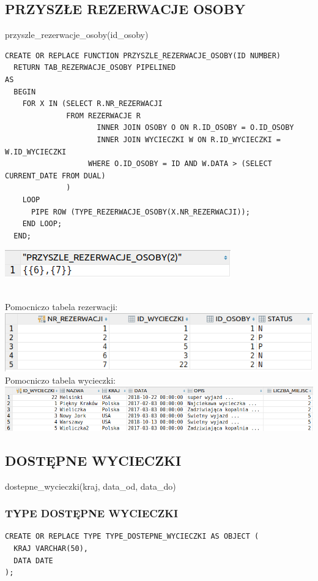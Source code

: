 \subsection{PRZYSZŁE REZERWACJE OSOBY}
przyszle\_rezerwacje\_osoby(id\_osoby)

\begin{verbatim}
CREATE OR REPLACE FUNCTION PRZYSZLE_REZERWACJE_OSOBY(ID NUMBER)
  RETURN TAB_REZERWACJE_OSOBY PIPELINED
AS
  BEGIN
    FOR X IN (SELECT R.NR_REZERWACJI
              FROM REZERWACJE R
                     INNER JOIN OSOBY O ON R.ID_OSOBY = O.ID_OSOBY
                     INNER JOIN WYCIECZKI W ON R.ID_WYCIECZKI = W.ID_WYCIECZKI
                   WHERE O.ID_OSOBY = ID AND W.DATA > (SELECT CURRENT_DATE FROM DUAL)
              )
    LOOP
      PIPE ROW (TYPE_REZERWACJE_OSOBY(X.NR_REZERWACJI));
    END LOOP;
  END;
\end{verbatim}
\begin{minipage}{0.40\textwidth}
\includegraphics[width=\linewidth]{./images/przyszle_rezerwacje_osoby.png}
\end{minipage}\\
Pomocniczo tabela rezerwacji:\\
\includegraphics[width=\linewidth]{./images/przyszle_rezerwacje_osoby_rezerwacje.png}
Pomocniczo tabela wycieczki:\\
\includegraphics[width=\linewidth]{./images/przyszle_rezerwacje_osoby_wycieczki.png}
\subsection{DOSTĘPNE WYCIECZKI}
dostepne\_wycieczki(kraj, data\_od, data\_do)

\subsubsection{TYPE DOSTĘPNE WYCIECZKI}
\begin{verbatim}
CREATE OR REPLACE TYPE TYPE_DOSTEPNE_WYCIECZKI AS OBJECT (
  KRAJ VARCHAR(50),
  DATA DATE
);
\end{verbatim}

